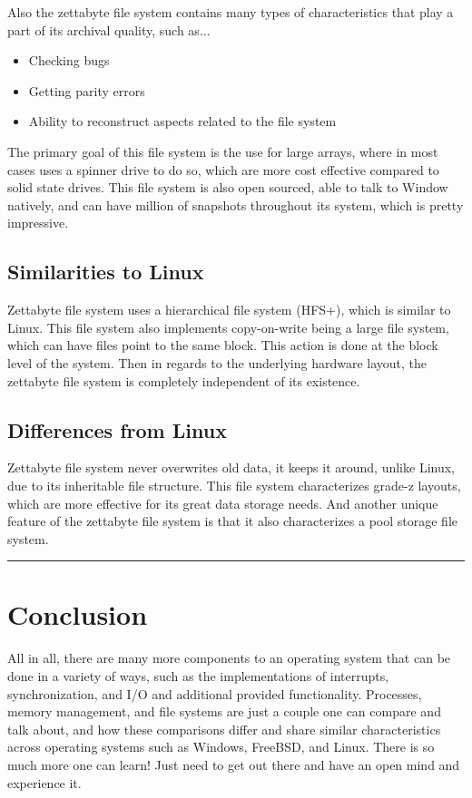\documentclass[letterpaper,10pt,onecolumn]{IEEEtran}
\begin{document}
\par
Also the zettabyte file system contains many types of characteristics that play a part of its archival quality, such as...
\begin{itemize}
	\item Checking bugs
	\item Getting parity errors
	\item Ability to reconstruct aspects related to the file system
\end{itemize} 

\par
The primary goal of this file system is the use for large arrays, where in most cases uses a spinner drive to do so, which are more cost effective compared to solid state drives. This file system is also open sourced, able to talk to Window natively, and can have million of snapshots throughout its system, which is pretty impressive.

	\subsection*{Similarities to Linux}
	\par
	Zettabyte file system uses a hierarchical file system (HFS+), which is similar to Linux. This file system also implements copy-on-write being a large file system, which can have files point to the same block. This action is done at the block level of the system. Then in regards to the underlying hardware layout, the zettabyte file system is completely independent of its existence.

	\subsection*{Differences from Linux}
	\par
	Zettabyte file system never overwrites old data, it keeps it around, unlike Linux, due to its inheritable file structure. This file system characterizes grade-z layouts, which are more effective for its great data storage needs. And another unique feature of the zettabyte file system is that it also characterizes a pool storage file system. 

\noindent\rule{17.8cm}{0.4pt}
\section{\textbf{Conclusion}}

\noindent
All in all, there are many more components to an operating system that can be done in a variety of ways, such as the implementations of interrupts, synchronization, and I/O and additional provided functionality. Processes, memory management, and file systems are just a couple one can compare and talk about, and how these comparisons differ and share similar characteristics across operating systems such as Windows, FreeBSD, and Linux. There is so much more one can learn! Just need to get out there and have an open mind and experience it.
\end{document}
